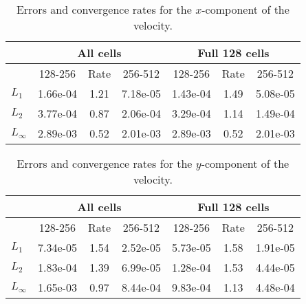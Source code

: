 
\begin{table}[htbp]
\begin{center}
\begin{tabular}{||l|c|c|c||c|c|c||} \hline
           & \multicolumn{3}{c||}{All cells} & \multicolumn{3}{c||}{Full 128 cells} \\ \hline
           & 128-256  & Rate & 256-512  & 128-256  & Rate & 256-512  \\ \hline
$L_1$      & 1.66e-04 & 1.21 & 7.18e-05 & 1.43e-04 & 1.49 & 5.08e-05 \\
$L_2$      & 3.77e-04 & 0.87 & 2.06e-04 & 3.29e-04 & 1.14 & 1.49e-04 \\
$L_\infty$ & 2.89e-03 & 0.52 & 2.01e-03 & 2.89e-03 & 0.52 & 2.01e-03 \\ \hline
\end{tabular}
\end{center}
\caption{Errors and convergence rates for the $x$-component of the velocity.}
\end{table}

\begin{table}[htbp]
\begin{center}
\begin{tabular}{||l|c|c|c||c|c|c||} \hline
           & \multicolumn{3}{c||}{All cells} & \multicolumn{3}{c||}{Full 128 cells} \\ \hline
           & 128-256  & Rate & 256-512  & 128-256  & Rate & 256-512  \\ \hline
$L_1$      & 7.34e-05 & 1.54 & 2.52e-05 & 5.73e-05 & 1.58 & 1.91e-05 \\
$L_2$      & 1.83e-04 & 1.39 & 6.99e-05 & 1.28e-04 & 1.53 & 4.44e-05 \\
$L_\infty$ & 1.65e-03 & 0.97 & 8.44e-04 & 9.83e-04 & 1.13 & 4.48e-04 \\ \hline
\end{tabular}
\end{center}
\caption{Errors and convergence rates for the $y$-component of the velocity.}
\end{table}
